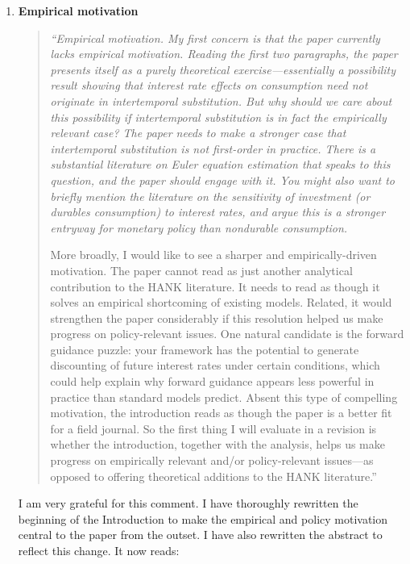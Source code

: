 \documentclass[11pt]{article}
\begin{document}
\begin{enumerate}
\item  \textbf{Empirical motivation}

\begin{quote}
\itshape ``Empirical motivation. My first concern is that the paper currently lacks empirical motivation. Reading the first two paragraphs, the paper presents itself as a purely theoretical exercise---essentially a possibility result showing that interest rate effects on consumption need not originate in intertemporal substitution. But why should we care about this possibility if intertemporal substitution is in fact the empirically relevant case? The paper needs to make a stronger case that intertemporal substitution is not first-order in practice. There is a substantial literature on Euler equation estimation that speaks to this question, and the paper should engage with it. You might also want to briefly mention the literature on the sensitivity of investment (or durables consumption) to interest rates, and argue this is a stronger entryway for monetary policy than nondurable consumption.

More broadly, I would like to see a sharper and empirically-driven motivation. The paper cannot read as just another analytical contribution to the HANK literature. It needs to read as though it solves an empirical shortcoming of existing models. Related, it would strengthen the paper considerably if this resolution helped us make progress on policy-relevant issues. One natural candidate is the forward guidance puzzle: your framework has the potential to generate discounting of future interest rates under certain conditions, which could help explain why forward guidance appears less powerful in practice than standard models predict. Absent this type of compelling motivation, the introduction reads as though the paper is a better fit for a field journal. So the first thing I will evaluate in a revision is whether the introduction, together with the analysis, helps us make progress on empirically relevant and/or policy-relevant issues---as opposed to offering theoretical additions to the HANK literature.''
\end{quote}

I am very grateful for this comment. I have thoroughly rewritten the beginning of the Introduction to make the empirical and policy motivation central to the paper from the outset. I have also rewritten the abstract to reflect this change. It now reads:


\end{enumerate}
\end{document}
